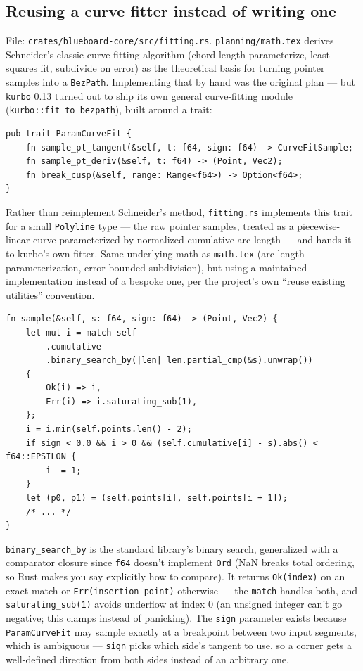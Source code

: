 \documentclass[11pt]{article}
\begin{document}
\subsection{Reusing a curve fitter instead of writing one}
File: \texttt{crates/blueboard-core/src/fitting.rs}. \texttt{planning/math.tex} derives
Schneider's classic curve-fitting algorithm (chord-length parameterize, least-squares fit,
subdivide on error) as the theoretical basis for turning pointer samples into a
\texttt{BezPath}. Implementing that by hand was the original plan — but \texttt{kurbo}
0.13 turned out to ship its own general curve-fitting module
(\texttt{kurbo::fit\_to\_bezpath}), built around a trait:
\begin{lstlisting}
pub trait ParamCurveFit {
    fn sample_pt_tangent(&self, t: f64, sign: f64) -> CurveFitSample;
    fn sample_pt_deriv(&self, t: f64) -> (Point, Vec2);
    fn break_cusp(&self, range: Range<f64>) -> Option<f64>;
}
\end{lstlisting}
Rather than reimplement Schneider's method, \texttt{fitting.rs} implements this trait for
a small \texttt{Polyline} type — the raw pointer samples, treated as a piecewise-linear
curve parameterized by normalized cumulative arc length — and hands it to kurbo's own
fitter. Same underlying math as \texttt{math.tex} (arc-length parameterization,
error-bounded subdivision), but using a maintained implementation instead of a bespoke
one, per the project's own ``reuse existing utilities'' convention.
\begin{lstlisting}
fn sample(&self, s: f64, sign: f64) -> (Point, Vec2) {
    let mut i = match self
        .cumulative
        .binary_search_by(|len| len.partial_cmp(&s).unwrap())
    {
        Ok(i) => i,
        Err(i) => i.saturating_sub(1),
    };
    i = i.min(self.points.len() - 2);
    if sign < 0.0 && i > 0 && (self.cumulative[i] - s).abs() < f64::EPSILON {
        i -= 1;
    }
    let (p0, p1) = (self.points[i], self.points[i + 1]);
    /* ... */
}
\end{lstlisting}
\texttt{binary\_search\_by} is the standard library's binary search, generalized with a
comparator closure since \texttt{f64} doesn't implement \texttt{Ord} (NaN breaks total
ordering, so Rust makes you say explicitly how to compare). It returns
\texttt{Ok(index)} on an exact match or \texttt{Err(insertion\_point)} otherwise — the
\texttt{match} handles both, and \texttt{saturating\_sub(1)} avoids underflow at index 0
(an unsigned integer can't go negative; this clamps instead of panicking). The \texttt{sign}
parameter exists because \texttt{ParamCurveFit} may sample exactly at a breakpoint between
two input segments, which is ambiguous — \texttt{sign} picks which side's tangent to use,
so a corner gets a well-defined direction from both sides instead of an arbitrary one.
\end{document}
